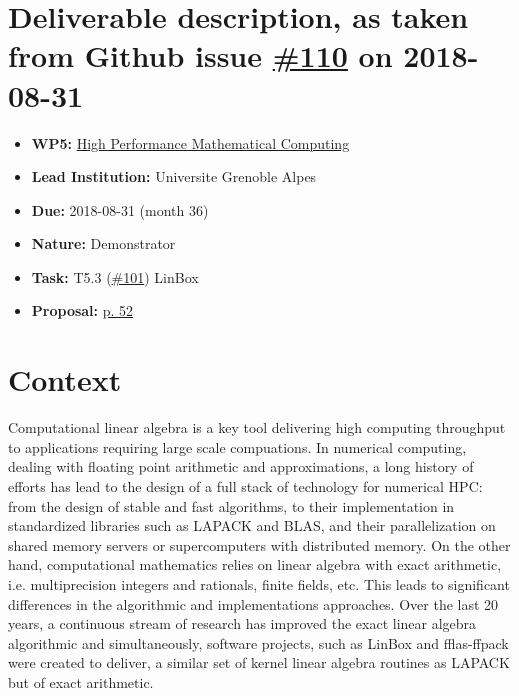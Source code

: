 \section*{\texorpdfstring{Deliverable description, as taken from Github
issue
\href{https://github.com/OpenDreamKit/OpenDreamKit/issues/110}{\#110} on
2018-08-31}{Deliverable description, as taken from Github issue \#110 on 2018-08-31}}

\begin{itemize}
\tightlist
\item
  \textbf{WP5:}
  \href{https://github.com/OpenDreamKit/OpenDreamKit/tree/master/WP5}{High
  Performance Mathematical Computing}
\item
  \textbf{Lead Institution:} Universite Grenoble Alpes
\item
  \textbf{Due:} 2018-08-31 (month 36)
\item
  \textbf{Nature:} Demonstrator
\item
  \textbf{Task:} T5.3
  (\href{https://github.com/OpenDreamKit/OpenDreamKit/issues/101}{\#101})
  LinBox
\item
  \textbf{Proposal:}
  \href{https://github.com/OpenDreamKit/OpenDreamKit/raw/master/Proposal/proposal-www.pdf}{p.
  52}
\end{itemize}

\section*{Context}

Computational linear algebra is a key tool delivering high computing
throughput to applications requiring large scale compuations. In
numerical computing, dealing with floating point arithmetic and
approximations, a long history of efforts has lead to the design of a
full stack of technology for numerical HPC: from the design of stable
and fast algorithms, to their implementation in standardized libraries
such as LAPACK and BLAS, and their parallelization on shared memory
servers or supercomputers with distributed memory. On the other hand,
computational mathematics relies on linear algebra with exact
arithmetic, i.e. multiprecision integers and rationals, finite fields,
etc. This leads to significant differences in the algorithmic and
implementations approaches. Over the last 20 years, a continuous stream
of research has improved the exact linear algebra algorithmic and
simultaneously, software projects, such as LinBox and fflas-ffpack were
created to deliver, a similar set of kernel linear algebra routines as
LAPACK but of exact arithmetic.

